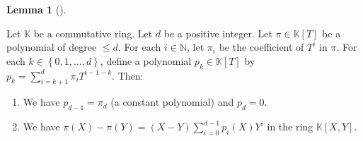 \documentclass[numbers=enddot,12pt,final,onecolumn,notitlepage]{scrartcl}%
\theoremstyle{definition}
\newtheorem{lem}[theo]{Lemma}
\newenvironment{lemma}[1][]
{\begin{lem}[#1]\begin{leftbar}}
{\end{leftbar}\end{lem}}
\let\sumnonlimits\sum
\renewcommand{\sum}{\sumnonlimits\limits}
\begin{document}
\begin{lemma}
\label{lem.F.u(pi).dividiff}Let $\mathbb{K}$ be a commutative ring. Let $d$ be
a positive integer. Let $\pi\in\mathbb{K}\left[  T\right]  $ be a polynomial
of degree $\leq d$. For each $i\in\mathbb{N}$, let $\pi_{i}$ be the
coefficient of $T^{i}$ in $\pi$. For each $k\in\left\{  0,1,\ldots,d\right\}
$, define a polynomial $p_{k}\in\mathbb{K}\left[  T\right]  $ by $p_{k}%
=\sum_{i=k+1}^{d}\pi_{i}T^{i-1-k}$. Then:

\begin{enumerate}
\item[\textbf{(a)}] We have $p_{d-1}=\pi_{d}$ (a constant polynomial) and
$p_{d}=0$.

\item[\textbf{(b)}] We have $\pi\left(  X\right)  -\pi\left(  Y\right)
=\left(  X-Y\right)  \sum_{i=0}^{d-1}p_{i}\left(  X\right)  Y^{i}$ in the ring
$\mathbb{K}\left[  X,Y\right]  $.
\end{enumerate}
\end{lemma}
\end{document}
